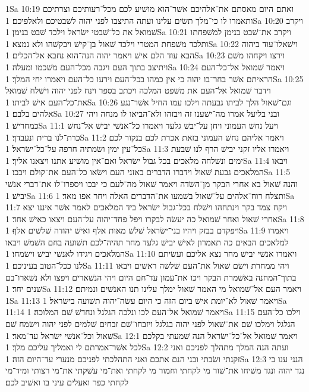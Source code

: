 1Sa 10:19  ואתם היום מאסתם את־אלהיכם אשׁר־הוא מושׁיע לכם מכל־רעותיכם וצרתיכם ותאמרו לו כי־מלך תשׂים עלינו ועתה התיצבו לפני יהוה לשׁבטיכם ולאלפיכם׃
1Sa 10:20  ויקרב שׁמואל את כל־שׁבטי ישׂראל וילכד שׁבט בנימן׃
1Sa 10:21  ויקרב את־שׁבט בנימן למשׁפחתו ותלכד משׁפחת המטרי וילכד שׁאול בן־קישׁ ויבקשׁהו ולא נמצא׃
1Sa 10:22  וישׁאלו־עוד ביהוה הבא עוד הלם אישׁ ויאמר יהוה הנה־הוא נחבא אל־הכלים׃
1Sa 10:23  וירצו ויקחהו משׁם ויתיצב בתוך העם ויגבה מכל־העם משׁכמו ומעלה׃
1Sa 10:24  ויאמר שׁמואל אל־כל־העם הראיתם אשׁר בחר־בו יהוה כי אין כמהו בכל־העם וירעו כל־העם ויאמרו יחי המלך׃
1Sa 10:25  וידבר שׁמואל אל־העם את משׁפט המלכה ויכתב בספר וינח לפני יהוה וישׁלח שׁמואל את־כל־העם אישׁ לביתו׃
1Sa 10:26  וגם־שׁאול הלך לביתו גבעתה וילכו עמו החיל אשׁר־נגע אלהים בלבם׃
1Sa 10:27  ובני בליעל אמרו מה־ישׁענו זה ויבזהו ולא־הביאו לו מנחה ויהי כמחרישׁ׃
1Sa 11:1  ויעל נחשׁ העמוני ויחן על־יבשׁ גלעד ויאמרו כל־אנשׁי יבישׁ אל־נחשׁ כרת־לנו ברית ונעבדך׃
1Sa 11:2  ויאמר אליהם נחשׁ העמוני בזאת אכרת לכם בנקור לכם כל־עין ימין ושׂמתיה חרפה על־כל־ישׂראל׃
1Sa 11:3  ויאמרו אליו זקני יבישׁ הרף לנו שׁבעת ימים ונשׁלחה מלאכים בכל גבול ישׂראל ואם־אין מושׁיע אתנו ויצאנו אליך׃
1Sa 11:4  ויבאו המלאכים גבעת שׁאול וידברו הדברים באזני העם וישׂאו כל־העם את־קולם ויבכו׃
1Sa 11:5  והנה שׁאול בא אחרי הבקר מן־השׂדה ויאמר שׁאול מה־לעם כי יבכו ויספרו־לו את־דברי אנשׁי יבישׁ׃
1Sa 11:6  ותצלח רוח־אלהים על־שׁאול בשׁמעו את־הדברים האלה ויחר אפו מאד׃
1Sa 11:7  ויקח צמד בקר וינתחהו וישׁלח בכל־גבול ישׂראל ביד המלאכים לאמר אשׁר איננו יצא אחרי שׁאול ואחר שׁמואל כה יעשׂה לבקרו ויפל פחד־יהוה על־העם ויצאו כאישׁ אחד׃
1Sa 11:8  ויפקדם בבזק ויהיו בני־ישׂראל שׁלשׁ מאות אלף ואישׁ יהודה שׁלשׁים אלף׃
1Sa 11:9  ויאמרו למלאכים הבאים כה תאמרון לאישׁ יבישׁ גלעד מחר תהיה־לכם תשׁועה בחם השׁמשׁ ויבאו המלאכים ויגידו לאנשׁי יבישׁ וישׂמחו׃
1Sa 11:10  ויאמרו אנשׁי יבישׁ מחר נצא אליכם ועשׂיתם לנו ככל־הטוב בעיניכם׃
1Sa 11:11  ויהי ממחרת וישׂם שׁאול את־העם שׁלשׁה ראשׁים ויבאו בתוך־המחנה באשׁמרת הבקר ויכו את־עמון עד־חם היום ויהי הנשׁארים ויפצו ולא נשׁארו־בם שׁנים יחד׃
1Sa 11:12  ויאמר העם אל־שׁמואל מי האמר שׁאול ימלך עלינו תנו האנשׁים ונמיתם׃
1Sa 11:13  ויאמר שׁאול לא־יומת אישׁ ביום הזה כי היום עשׂה־יהוה תשׁועה בישׂראל׃
1Sa 11:14  ויאמר שׁמואל אל־העם לכו ונלכה הגלגל ונחדשׁ שׁם המלוכה׃
1Sa 11:15  וילכו כל־העם הגלגל וימלכו שׁם את־שׁאול לפני יהוה בגלגל ויזבחו־שׁם זבחים שׁלמים לפני יהוה וישׂמח שׁם שׁאול וכל־אנשׁי ישׂראל עד־מאד׃
1Sa 12:1  ויאמר שׁמואל אל־כל־ישׂראל הנה שׁמעתי בקלכם לכל אשׁר־אמרתם לי ואמליך עליכם מלך׃
1Sa 12:2  ועתה הנה המלך מתהלך לפניכם ואני זקנתי ושׂבתי ובני הנם אתכם ואני התהלכתי לפניכם מנערי עד־היום הזה׃
1Sa 12:3  הנני ענו בי נגד יהוה ונגד משׁיחו את־שׁור מי לקחתי וחמור מי לקחתי ואת־מי עשׁקתי את־מי רצותי ומיד־מי לקחתי כפר ואעלים עיני בו ואשׁיב לכם׃
